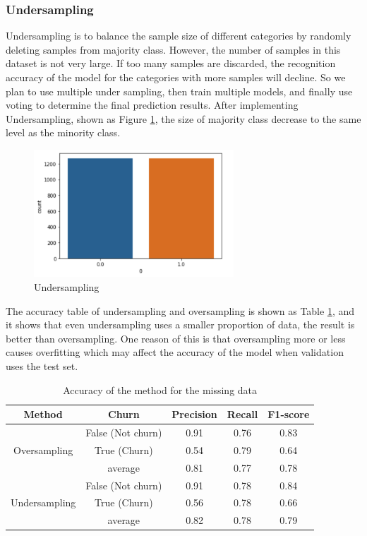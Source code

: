 \documentclass{article}
\begin{document}
\subsubsection{Undersampling}
Undersampling is to balance the sample size of different categories by randomly deleting samples from majority class. However, the number of samples in this dataset is not very large. If too many samples are discarded, the recognition accuracy of the model for the categories with more samples will decline. So we plan to use multiple under sampling, then train multiple models, and finally use voting to determine the final prediction results. After implementing Undersampling, shown as Figure \ref{fig:undersampling}, the size of majority class decrease to the same level as the minority class. 
\FloatBarrier
\begin{figure}[htb]
    \centering
    \includegraphics[width=7.5cm]{Undersampling}
    \caption{Undersampling}
    \label{fig:undersampling}
\end{figure}
\FloatBarrier

\noindent The accuracy table of undersampling and oversampling is shown as Table \ref{Accucray of Oversampling and Undersampling}, and it shows that even undersampling uses a smaller proportion of data, the result is better than oversampling. One reason of this is that oversampling more or less causes overfitting which may affect the accuracy of the model when validation uses the test set.
\FloatBarrier
\begin{table}[htb]
\centering
\caption{Accuracy of the method for the missing data}
	\begin{tabular}{||c c c c c||} 
	 \hline
 	Method & Churn & Precision & Recall & F1-score  \\ [0.5ex] 
 	\hline\hline
   	& False (Not churn) & 0.91 & 0.76 & 0.83 \\ 
  	Oversampling & True (Churn) & 0.54 & 0.79 & 0.64 \\
   	& average & 0.81 & 0.77 & 0.78 \\
   	\hline
  	& False (Not churn) & 0.91 & 0.78 & 0.84 \\
 	Undersampling & True (Churn) & 0.56 & 0.78 & 0.66 \\
  	& average & 0.82 & 0.78 & 0.79 \\ [1ex] 
 	\hline
	\end{tabular}
\label{Accucray of Oversampling and Undersampling}
\end{table}
\FloatBarrier
\end{document}

